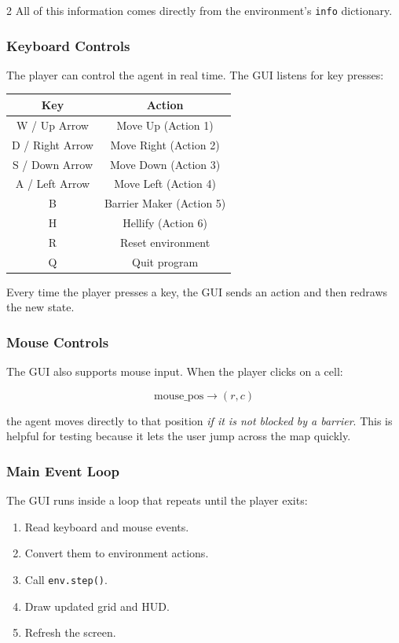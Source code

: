 \documentclass[a4paper]{article}
\begin{document}
\begin{multicols}{2}
All of this information comes directly from the environment’s \texttt{info} dictionary.


\subsubsection{Keyboard Controls}

The player can control the agent in real time. The GUI listens for key presses:

\begin{center}
\begin{tabular}{|c|c|}
\hline
\textbf{Key} & \textbf{Action} \\
\hline
W / Up Arrow & Move Up (Action 1) \\
D / Right Arrow & Move Right (Action 2) \\
S / Down Arrow & Move Down (Action 3) \\
A / Left Arrow & Move Left (Action 4) \\
B & Barrier Maker (Action 5) \\
H & Hellify (Action 6) \\
R & Reset environment \\
Q & Quit program \\
\hline
\end{tabular}
\end{center}

Every time the player presses a key, the GUI sends an action and then redraws the new state.

\subsubsection{Mouse Controls}

The GUI also supports mouse input. When the player clicks on a cell:

\[
\text{mouse\_pos} \rightarrow (r,c)
\]

the agent moves directly to that position \emph{if it is not blocked by a barrier}.  
This is helpful for testing because it lets the user jump across the map quickly.

\subsubsection{Main Event Loop}

The GUI runs inside a loop that repeats until the player exits:

\begin{enumerate}
    \item Read keyboard and mouse events.
    \item Convert them to environment actions.
    \item Call \texttt{env.step()}.
    \item Draw updated grid and HUD.
    \item Refresh the screen.
\end{enumerate}


\end{multicols}
\end{document}
